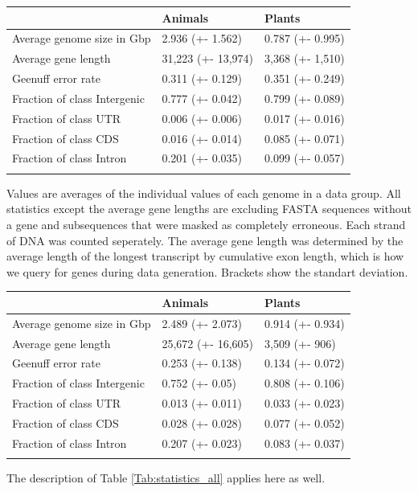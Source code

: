 \documentclass{bioinfo}
\begin{document}
\begin{methods}
\begin{table}[!t]
 {
\begin{tabular}{@{}lll@{}}
\toprule & Animals & Plants\\
\midrule
Average genome size in Gbp& 2.936 (+- 1.562) & 0.787 (+- 0.995) \\
Average gene length & 31,223 (+- 13,974)& 3,368 (+- 1,510)\\
Geenuff error rate & 0.311 (+- 0.129) & 0.351 (+- 0.249) \\
Fraction of class Intergenic  & 0.777 (+- 0.042) & 0.799 (+- 0.089) \\
Fraction of class UTR & 0.006 (+- 0.006) & 0.017 (+- 0.016) \\
Fraction of class CDS & 0.016 (+- 0.014) & 0.085 (+- 0.071) \\
Fraction of class Intron & 0.201 (+- 0.035) & 0.099 (+- 0.057) \\
\botrule
\end{tabular}}{Values are averages of the individual values of each genome in a data group. All statistics except the average gene lengths are excluding FASTA sequences without a gene and subsequences that were masked as completely erroneous. Each strand of DNA was counted seperately. The average gene length was determined by the average length of the longest transcript by cumulative exon length, which is how we query for genes during data generation. Brackets show the standart deviation.}
\end{table}

\begin{table}[!t]
 {
\begin{tabular}{@{}lll@{}}
\toprule & Animals & Plants\\
\midrule
Average genome size in Gbp& 2.489 (+- 2.073) & 0.914 (+- 0.934) \\
Average gene length & 25,672 (+- 16,605) & 3,509 (+- 906)\\
Geenuff error rate & 0.253 (+- 0.138) & 0.134 (+- 0.072) \\
Fraction of class Intergenic & 0.752 (+- 0.05) & 0.808 (+- 0.106) \\
Fraction of class UTR & 0.013 (+- 0.011) & 0.033 (+- 0.023) \\
Fraction of class CDS & 0.028 (+- 0.028) & 0.077 (+- 0.052) \\
Fraction of class Intron  & 0.207 (+- 0.023) & 0.083 (+- 0.037) \\
\botrule
\end{tabular}}{The description of Table \ref{Tab:statistics_all} applies here as well.}
\end{table}


\end{methods}
\end{document}
